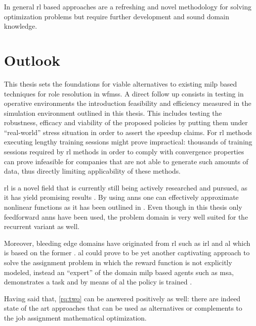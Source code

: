 In general \gls{rl} based approaches are a refreshing and novel methodology for solving optimization problems but require further development and sound domain knowledge.

\section{Outlook}
\label{sec:outlook}

This thesis sets the foundations for viable alternatives to existing \gls{milp} based techniques for role resolution in \glspl{wfms}. A direct follow up consists in testing in operative environments the introduction feasibility and efficiency measured in the simulation environment outlined in this thesis. This includes testing the robustness, efficacy and viability of the proposed policies by putting them under ``real-world'' stress situation in order to assert the speedup claims. For \gls{rl} methods executing lengthy training sessions might prove impractical: thousands of training sessions required by \gls{rl} methods in order to comply with convergence properties can prove infeasible for companies that are not able to generate such amounts of data, thus directly limiting applicability of these methods.

\gls{rl} is a novel field that is currently still being actively researched and pursued, as it has yield promising results \citep{Mnih2015,Silver2016}. By using \glspl{ann} one can effectively approximate nonlinear functions as it has been outlined in . Even though in this thesis only feedforward \glspl{ann} have been used, the problem domain is very well suited for the recurrent variant as well.

Moreover, bleeding edge domains have originated from \gls{rl} such as \gls{irl} \citep{Ng2000} and \gls{al} which is based on the former \citep{Abbeel2004}. \gls{al} could prove to be yet another captivating approach to solve the assignment problem in which the reward function is not explicitly modeled, instead an ``expert'' of the domain \ie \gls{milp} based agents such as \gls{msa}, demonstrates a task and by means of \gls{al} the policy is trained \citep{Abbeel2004}.

Having said that, \ref{rq:two} can be answered positively as well: there are indeed state of the art approaches that can be used as alternatives or complements to the job assignment mathematical optimization. 
